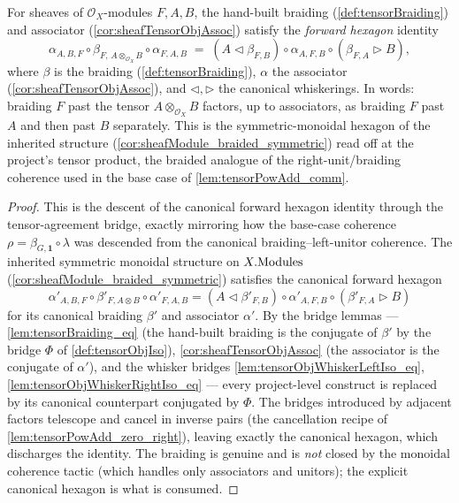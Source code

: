 \begin{lemma}\leanok
  \label{lem:tensorBraiding_hexagon_forward}
  For sheaves of \(\mathcal{O}_X\)-modules \(F, A, B\), the hand-built braiding
  (\cref{def:tensorBraiding}) and associator (\cref{cor:sheafTensorObjAssoc})
  satisfy the \emph{forward hexagon} identity
  \[
    \alpha_{A,B,F} \circ
    \beta_{F,\,A\otimes_{\mathcal{O}_X}B} \circ
    \alpha_{F,A,B}
    \;=\;
    (A \lhd \beta_{F,B}) \circ
    \alpha_{A,F,B} \circ
    (\beta_{F,A} \rhd B),
  \]
  where \(\beta\) is the braiding (\cref{def:tensorBraiding}), \(\alpha\) the
  associator (\cref{cor:sheafTensorObjAssoc}), and \(\lhd,\rhd\) the canonical
  whiskerings. In words: braiding \(F\) past the tensor \(A\otimes_{\mathcal{O}_X}
  B\) factors, up to associators, as braiding \(F\) past \(A\) and then past
  \(B\) separately. This is the symmetric-monoidal hexagon of the inherited
  structure (\cref{cor:sheafModule_braided_symmetric}) read off at the project's
  tensor product, the braided analogue of the right-unit/braiding coherence used
  in the base case of \cref{lem:tensorPowAdd_comm}.
\end{lemma}

\begin{proof}
  \leanok
  This is the descent of the canonical forward hexagon identity
  through the tensor-agreement bridge, exactly mirroring how the
  base-case coherence \(\rho = \beta_{G,\mathbf{1}}\circ\lambda\) was descended
  from the canonical braiding--left-unitor coherence. The inherited symmetric
  monoidal structure on \(X.\mathrm{Modules}\) (\cref{cor:sheafModule_braided_symmetric})
  satisfies the canonical forward hexagon
  \[
    \alpha'_{A,B,F}\circ\beta'_{F,A\otimes B}\circ\alpha'_{F,A,B}
    = (A\lhd\beta'_{F,B})\circ\alpha'_{A,F,B}\circ(\beta'_{F,A}\rhd B)
  \]
  for its canonical braiding \(\beta'\) and associator \(\alpha'\). By the bridge
  lemmas --- \cref{lem:tensorBraiding_eq} (the hand-built braiding is the
  conjugate of \(\beta'\) by the bridge \(\Phi\) of \cref{def:tensorObjIso}),
  \cref{cor:sheafTensorObjAssoc} (the associator is the conjugate of \(\alpha'\)),
  and the whisker bridges \cref{lem:tensorObjWhiskerLeftIso_eq},
  \cref{lem:tensorObjWhiskerRightIso_eq} --- every project-level construct is
  replaced by its canonical counterpart conjugated by \(\Phi\). The bridges
  introduced by adjacent factors telescope and cancel in inverse pairs (the
  cancellation recipe of \cref{lem:tensorPowAdd_zero_right}), leaving exactly the
  canonical hexagon, which discharges the identity. The braiding is genuine and is
  \emph{not} closed by the \(\mathrm{monoidal}\) coherence tactic (which handles
  only associators and unitors); the explicit canonical hexagon is what is
  consumed.
\end{proof}

